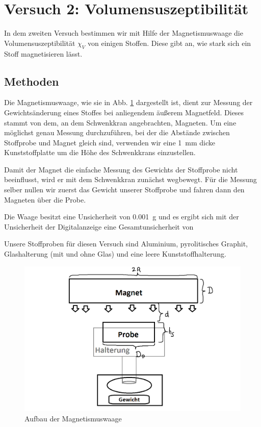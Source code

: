 \documentclass[11pt,a4paper,titlepage, ngerman]{article}
\begin{document}
	\section{Versuch 2: Volumensuszeptibilität}		
		
		In dem zweiten Versuch bestimmen wir mit Hilfe der Magnetismuswaage die Volumensuszeptibilität $\chi _V$ von einigen Stoffen. Diese gibt an, wie stark sich ein Stoff magnetisieren lässt.		
		
		\subsection*{Methoden} 
		
			Die Magnetismuswaage, wie sie in Abb. \ref{} dargestellt ist, dient zur Messung der Gewichtsänderung eines Stoffes bei anliegendem äußerem Magnetfeld. Dieses stammt von dem, an dem Schwenkkran angebrachten, Magneten.
			Um eine möglichst genau Messung durchzuführen, bei der die Abstände zwischen Stoffprobe und Magnet gleich sind, verwenden wir eine \SI{1}{\mm} dicke Kunststoffplatte um die Höhe des Schwenkkrans einzustellen.
			
			Damit der Magnet die einfache Messung des Gewichts der Stoffprobe nicht beeinflusst, wird er mit dem Schwenkkran zunächst wegbewegt.
			Für die Messung selber nullen wir zuerst das Gewicht unserer Stoffprobe und fahren dann den Magneten über die Probe.
			
			Die Waage besitzt eine Unsicherheit von \SI{0,001}{\g} und es ergibt sich mit der Unsicherheit der Digitalanzeige eine Gesamtunsicherheit von %
			
			Unsere Stoffproben für diesen Versuch sind Aluminium, pyrolitisches Graphit, Glashalterung (mit und ohne Glas) und eine leere Kunststoffhalterung.
			
			\begin{figure}
				\includegraphics[width=\textwidth]{SkizzeMagnetwaage.png}
				\caption{Aufbau der Magnetismuswaage}
				\label{fig:Magnetismuswaage}
			\end{figure}
		
\end{document}
